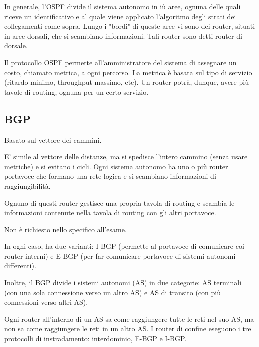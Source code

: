         In generale, l'OSPF divide il sistema autonomo in iù aree, ognuna delle quali riceve un identificativo e al quale viene applicato l'algoritmo degli strati dei collegamenti come sopra. Lungo i "bordi" di queste aree vi sono dei router, situati in aree dorsali, che si scambiano informazioni. Tali router sono detti router di dorsale.
        
        Il protocollo OSPF permette all'amministratore del sistema di assegnare un costo, chiamato metrica, a ogni percorso. La metrica è basata sul tipo di servizio (ritardo minimo, throughput massimo, etc). Un router potrà, dunque, avere più tavole di routing, ognuna per un certo servizio.
    
    \subsection{BGP}
        
        Basato sul vettore dei cammini.
        
        E' simile al vettore delle distanze, ma si spedisce l'intero cammino (senza usare metriche) e si evitano i cicli. Ogni sistema autonomo ha uno o più router portavoce che formano una rete logica e si scambiano informazioni di raggiungibilità. 
        
        Ognuno di questi router gestisce una propria tavola di routing e scambia le informazioni contenute nella tavola di routing con gli altri portavoce.
        
        \vspace{3mm}
        
        Non è richiesto nello specifico all'esame.
        
        \vspace{3mm}
        
        In ogni caso, ha due varianti: I-BGP (permette al portavoce di comunicare coi router interni) e E-BGP (per far comunicare portavoce di sistemi autonomi differenti).
        
        Inoltre, il BGP divide i sistemi autonomi (AS) in due categorie: AS terminali (con una sola connessione verso un altro AS) e AS di transito (con più connessioni verso altri AS).
        
        \vspace{3mm}
        
        Ogni router all'interno di un AS sa come raggiungere tutte le reti nel suo AS, ma non sa come raggiungere le reti in un altro AS. I router di confine eseguono i tre protocolli di instradamento: interdominio, E-BGP e I-BGP.